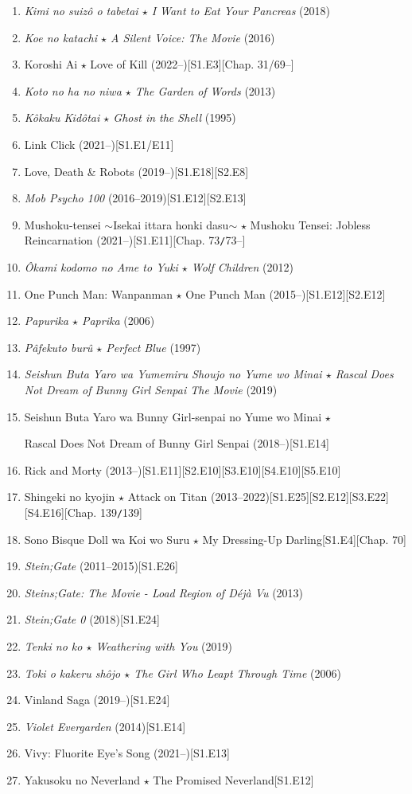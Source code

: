 \documentclass{article}
\numberwithin{equation}{section}
\begin{document}
\begin{enumerate}
    \item \textit{Kimi no suizô o tabetai $\star$ I Want to Eat Your Pancreas} (2018)
    \item \textit{Koe no katachi $\star$ A Silent Voice: The Movie} (2016)
    \item Koroshi Ai $\star$ Love of Kill (2022--)\hfill[S1.E3][Chap. 31/69--]
    \item \textit{Koto no ha no niwa $\star$ The Garden of Words} (2013)
    \item \textit{Kôkaku Kidôtai $\star$ Ghost in the Shell} (1995)
    \item Link Click (2021--)\hfill[S1.E1/E11]
    \item Love, Death \& Robots (2019--)\hfill[S1.E18][S2.E8]
    \item \textit{Mob Psycho 100} (2016--2019)\hfill[S1.E12][S2.E13]
    \item Mushoku-tensei $\sim$Isekai ittara honki dasu$\sim$ $\star$ Mushoku Tensei: Jobless Reincarnation (2021--)\hfill[S1.E11][Chap. 73\texttt{/}73--]
    \item \textit{Ôkami kodomo no Ame to Yuki $\star$ Wolf Children} (2012)
    \item One Punch Man: Wanpanman $\star$ One Punch Man (2015--)\hfill[S1.E12][S2.E12]
    \item \textit{Papurika $\star$ Paprika} (2006)
    \item \textit{Pâfekuto burû $\star$ Perfect Blue} (1997)
    \item \textit{Seishun Buta Yaro wa Yumemiru Shoujo no Yume wo Minai $\star$ Rascal Does Not Dream of Bunny Girl Senpai The Movie} (2019)
    \item Seishun Buta Yaro wa Bunny Girl-senpai no Yume wo Minai $\star$
    
    Rascal Does Not Dream of Bunny Girl Senpai (2018--)\hfill[S1.E14]
    \item Rick and Morty (2013--)\hfill[S1.E11][S2.E10][S3.E10][S4.E10][S5.E10]
    \item Shingeki no kyojin $\star$ Attack on Titan (2013--2022)\hfill[S1.E25][S2.E12][S3.E22][S4.E16][Chap. 139\texttt{/}139]
    \item Sono Bisque Doll wa Koi wo Suru $\star$ My Dressing-Up Darling\hfill[S1.E4][Chap. 70]
    \item \textit{Stein;Gate} (2011--2015)\hfill[S1.E26]
    \item \textit{Steins;Gate: The Movie - Load Region of Déjà Vu} (2013)
    \item \textit{Stein;Gate 0} (2018)\hfill[S1.E24]
    \item \textit{Tenki no ko $\star$ Weathering with You} (2019)
    \item \textit{Toki o kakeru shôjo $\star$ The Girl Who Leapt Through Time} (2006)
    \item Vinland Saga (2019--)\hfill[S1.E24]
    \item \textit{Violet Evergarden} (2014)\hfill[S1.E14]
    \item Vivy: Fluorite Eye's Song (2021--)\hfill[S1.E13]
    \item Yakusoku no Neverland $\star$ The Promised Neverland\hfill[S1.E12]
\end{enumerate}
\end{document}
